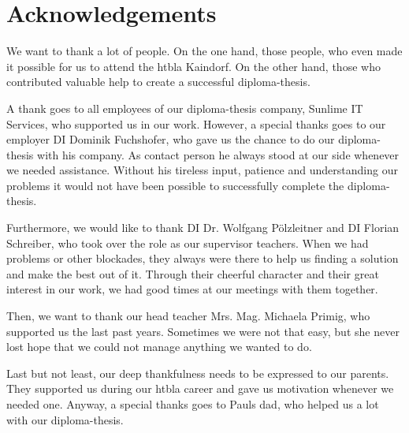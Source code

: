 \chapter*{Acknowledgements}
We want to thank a lot of people. On the one hand, those people, who even made it possible for us to attend the \gls{htbla} Kaindorf. On the other hand, those who contributed valuable help to create a successful diploma-thesis.

A thank goes to all employees of our diploma-thesis company, Sunlime IT Services, who supported us in our work. However, a special thanks goes to our employer DI Dominik Fuchshofer, who gave us the chance to do our diploma-thesis with his company. As contact person he always stood at our side whenever we needed assistance. Without his tireless input, patience and understanding our problems it would not have been possible to successfully complete the diploma-thesis.

Furthermore, we would like to thank DI Dr. Wolfgang Pölzleitner and DI Florian Schreiber, who took over the role as our supervisor teachers. When we had problems or other blockades, they always were there to help us finding a solution and make the best out of it. Through their cheerful character and their great interest in our work, we had good times at our meetings with them together.

Then, we want to thank our head teacher Mrs. Mag. Michaela Primig, who supported us the last past years. Sometimes we were not that easy, but she never lost hope that we could not manage anything we wanted to do.

Last but not least, our deep thankfulness needs to be expressed to our parents. They supported us during our \gls{htbla} career and gave us motivation whenever we needed one. Anyway, a special thanks goes to Pauls dad, who helped us a lot with our diploma-thesis.
\clearpageauthor

